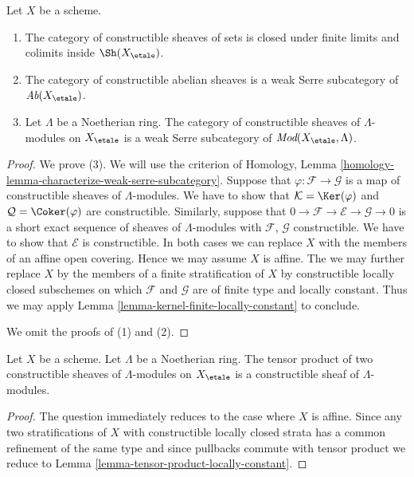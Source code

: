 \begin{lemma}
\label{lemma-constructible-abelian}
Let $X$ be a scheme.
\begin{enumerate}
\item The category of constructible sheaves of sets
is closed under finite limits and colimits inside $\Sh(X_\etale)$.
\item The category of constructible abelian sheaves is a
weak Serre subcategory of $\textit{Ab}(X_\etale)$.
\item Let $\Lambda$ be a Noetherian ring. The category of
constructible sheaves of $\Lambda$-modules on
$X_\etale$ is a weak Serre subcategory of
$\textit{Mod}(X_\etale, \Lambda)$.
\end{enumerate}
\end{lemma}

\begin{proof}
We prove (3). We will use the criterion of
Homology, Lemma \ref{homology-lemma-characterize-weak-serre-subcategory}.
Suppose that $\varphi : \mathcal{F} \to \mathcal{G}$
is a map of constructible sheaves of $\Lambda$-modules.
We have to show that $\mathcal{K} = \Ker(\varphi)$ and
$\mathcal{Q} = \Coker(\varphi)$ are constructible. 
Similarly, suppose that
$0 \to \mathcal{F} \to \mathcal{E} \to \mathcal{G} \to 0$
is a short exact sequence of sheaves of $\Lambda$-modules
with $\mathcal{F}$, $\mathcal{G}$ constructible. We have to show
that $\mathcal{E}$ is constructible.
In both cases we can replace $X$ with the members of an
affine open covering. Hence we may assume $X$ is affine.
The we may further replace $X$ by the members of a finite
stratification of $X$ by constructible locally closed subschemes
on which $\mathcal{F}$ and $\mathcal{G}$ are of finite type and
locally constant. Thus we may apply
Lemma \ref{lemma-kernel-finite-locally-constant} to conclude.

\medskip\noindent
We omit the proofs of (1) and (2).
\end{proof}

\begin{lemma}
\label{lemma-tensor-product-constructible}
Let $X$ be a scheme. Let $\Lambda$ be a Noetherian ring.
The tensor product of two constructible sheaves of $\Lambda$-modules
on $X_\etale$ is a constructible sheaf of $\Lambda$-modules.
\end{lemma}

\begin{proof}
The question immediately reduces to the case where $X$ is affine.
Since any two stratifications of $X$ with constructible locally
closed strata has a common refinement of the same type and
since pullbacks commute with tensor product we reduce to
Lemma \ref{lemma-tensor-product-locally-constant}.
\end{proof}




